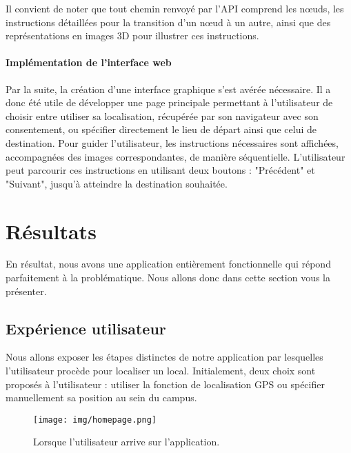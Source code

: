 \documentclass[journal, a4paper]{IEEEtran}
\begin{document}
Il convient de noter que tout chemin renvoyé par l'API comprend les nœuds, les instructions détaillées pour la transition d'un nœud à un autre, ainsi que des représentations en images 3D pour illustrer ces instructions.
\vspace{0.25cm}
\paragraph{Implémentation de l'interface web}
Par la suite, la création d'une interface graphique s'est avérée nécessaire. Il a donc été utile de développer une page principale permettant à l'utilisateur de choisir entre utiliser sa localisation, récupérée par son navigateur avec son consentement, ou spécifier directement le lieu de départ ainsi que celui de destination. Pour guider l'utilisateur, les instructions nécessaires sont affichées, accompagnées des images correspondantes, de manière séquentielle. L'utilisateur peut parcourir ces instructions en utilisant deux boutons : "Précédent" et "Suivant", jusqu'à atteindre la destination souhaitée.


\section{Résultats}
	En résultat, nous avons une application entièrement fonctionnelle qui répond parfaitement à la problématique. Nous allons donc dans cette section vous la présenter. 
 \subsection{Expérience utilisateur }
Nous allons exposer les étapes distinctes de notre application par lesquelles l'utilisateur procède pour localiser un local. Initialement, deux choix sont proposés à l'utilisateur : utiliser la fonction de localisation GPS ou spécifier manuellement sa position au sein du campus. 
        \begin{figure}[h]
		\begin{center}
		\texttt{[image: img/homepage.png]}
		\caption{Lorsque l'utilisateur arrive sur l'application.}
		\label{fig:tf_plot}
		\end{center}
	\end{figure}
\end{document}
